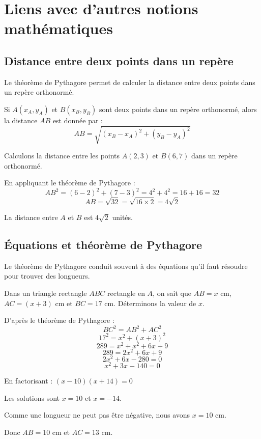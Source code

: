 \section{Liens avec d'autres notions mathématiques}

\subsection{Distance entre deux points dans un repère}

Le théorème de Pythagore permet de calculer la distance entre deux points dans un repère orthonormé.

Si $A(x_A, y_A)$ et $B(x_B, y_B)$ sont deux points dans un repère orthonormé, alors la distance $AB$ est donnée par :
\[AB = \sqrt{(x_B - x_A)^2 + (y_B - y_A)^2}\]

\begin{examplebox}
Calculons la distance entre les points $A(2, 3)$ et $B(6, 7)$ dans un repère orthonormé.

En appliquant le théorème de Pythagore :
\[AB^2 = (6-2)^2 + (7-3)^2 = 4^2 + 4^2 = 16 + 16 = 32\]
\[AB = \sqrt{32} = \sqrt{16 \times 2} = 4\sqrt{2}\]

La distance entre $A$ et $B$ est $4\sqrt{2}$ unités.
\end{examplebox}

\subsection{Équations et théorème de Pythagore}

Le théorème de Pythagore conduit souvent à des équations qu'il faut résoudre pour trouver des longueurs.

\begin{examplebox}
Dans un triangle rectangle $ABC$ rectangle en $A$, on sait que $AB = x$ cm, $AC = (x+3)$ cm et $BC = 17$ cm. Déterminons la valeur de $x$.

D'après le théorème de Pythagore :
\[BC^2 = AB^2 + AC^2\]
\[17^2 = x^2 + (x+3)^2\]
\[289 = x^2 + x^2 + 6x + 9\]
\[289 = 2x^2 + 6x + 9\]
\[2x^2 + 6x - 280 = 0\]
\[x^2 + 3x - 140 = 0\]

En factorisant : $(x - 10)(x + 14) = 0$

Les solutions sont $x = 10$ et $x = -14$.

Comme une longueur ne peut pas être négative, nous avons $x = 10$ cm.

Donc $AB = 10$ cm et $AC = 13$ cm.
\end{examplebox}

